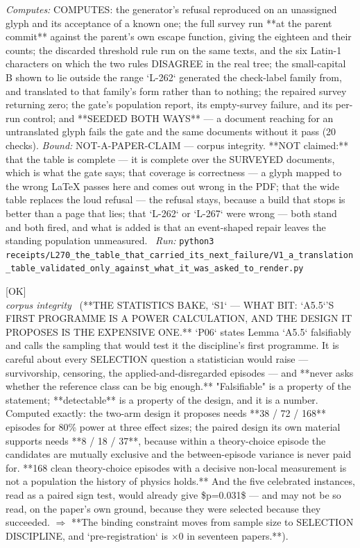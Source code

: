\begin{description}
\emph{Computes:} COMPUTES: the generator's refusal reproduced on an unassigned glyph and its acceptance of a known one; the full survey run **at the parent commit** against the parent's own escape function, giving the eighteen and their counts; the discarded threshold rule run on the same texts, and the six Latin-1 characters on which the two rules DISAGREE in the real tree; the small-capital B shown to lie outside the range `L-262` generated the check-label family from, and translated to that family's form rather than to nothing; the repaired survey returning zero; the gate's population report, its empty-survey failure, and its per-run control; and **SEEDED BOTH WAYS** --- a document reaching for an untranslated glyph fails the gate and the same documents without it pass (20 checks).
 \emph{Bound:} NOT-A-PAPER-CLAIM --- corpus integrity. **NOT claimed:** that the table is complete --- it is complete over the SURVEYED documents, which is what the gate says; that coverage is correctness --- a glyph mapped to the wrong LaTeX passes here and comes out wrong in the PDF; that the wide table replaces the loud refusal --- the refusal stays, because a build that stops is better than a page that lies; that `L-262` or `L-267` were wrong --- both stand and both fired, and what is added is that an event-shaped repair leaves the standing population unmeasured.
\ \emph{Run:} \texttt{python3 receipts/L270\_the\_table\_that\_carried\_its\_next\_failure/V1\_a\_translation\_table\_validated\_only\_against\_what\_it\_was\_asked\_to\_render.py}
\item[\label{rcpt:S1_the_first_programme_is_a_power_calculation_and_the_design_it_proposes_is_the_expensive_one}\texttt{S1\_the\_first\_programme\_is\_a\_power\_calculation\_and\_the\_design\_it\_proposes\_is\_the\_expensive\_one}]\hfill\textsf{[OK]}\\
\textit{corpus integrity} \ (**THE STATISTICS BAKE, `S1` --- WHAT BIT: `A5.5`'S FIRST PROGRAMME IS A POWER CALCULATION, AND THE DESIGN IT PROPOSES IS THE EXPENSIVE ONE.** `P06` states Lemma `A5.5` falsifiably and calls the sampling that would test it the discipline's first programme. It is careful about every SELECTION question a statistician would raise --- survivorship, censoring, the applied-and-disregarded episodes --- and **never asks whether the reference class can be big enough.** "Falsifiable" is a property of the statement; **detectable** is a property of the design, and it is a number. Computed exactly: the two-arm design it proposes needs **38 / 72 / 168** episodes for 80\% power at three effect sizes; the paired design its own material supports needs **8 / 18 / 37**, because within a theory-choice episode the candidates are mutually exclusive and the between-episode variance is never paid for. **168 clean theory-choice episodes with a decisive non-local measurement is not a population the history of physics holds.** And the five celebrated instances, read as a paired sign test, would already give \$p=0.031\$ --- and may not be so read, on the paper's own ground, because they were selected because they succeeded. \ensuremath{\Rightarrow} **The binding constraint moves from sample size to SELECTION DISCIPLINE, and `pre-registration` is \ensuremath{\times}0 in seventeen papers.**). 

\end{description}
